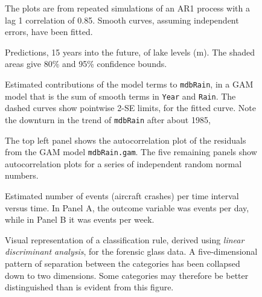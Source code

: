 \documentclass[12pt, a4paper,  BCOR=8.25mm, DIV=15]{scrartcl}\usepackage[]{graphicx}\usepackage[]{color}
\newcommand{\txtt}[1]{{\texttt{#1}}}
\begin{document}
\begin{figure}

\caption{The plots are from repeated simulations of an AR1 process with a
  lag 1 correlation of 0.85.  Smooth curves, assuming independent
  errors, have been fitted.}\label{fig:ar1fits}
\end{figure}

\begin{figure}

\caption{Predictions, 15 years into the future, of lake levels
  (m). The shaded areas give 80\% and 95\% confidence bounds.
}\label{Erie-fcastplot}
\end{figure}

\begin{figure}

  \caption{Estimated contributions of the model terms to
    \txtt{mdbRain}, in a GAM model that is the sum of smooth terms in
    \txtt{Year} and \txtt{Rain}. The dashed curves show pointwise
    2-SE limits, for the fitted curve.  Note the downturn
in the trend of \txtt{mdbRain} after about 1985,}\label{fig:mdbRainSM}
\end{figure}

\begin{figure}

\caption{The top left panel shows the autocorrelation plot of the
  residuals from the GAM model \txtt{mdbRain.gam}.  The five remaining
  panels show autocorrelation plots for a series of independent random
  normal numbers.}\label{fig:ar1sims}
\end{figure}

\begin{figure*}[h]

\caption{Estimated number of events (aircraft crashes) per time
  interval versus time.  In Panel A, the outcome variable was events
  per day, while in Panel B it was events per
  week.\label{fig:planeCrash}}
\end{figure*}

\begin{figure}

\caption{Visual representation of a classification rule, derived using
  {\em linear discriminant analysis}, for the forensic glass data.  A
  five-dimensional pattern of separation between the categories has
  been collapsed down to two dimensions.  Some categories may therefore
be better distinguished than is evident from this figure.
}
\label{fig:fgl}
\end{figure}
\end{document}
